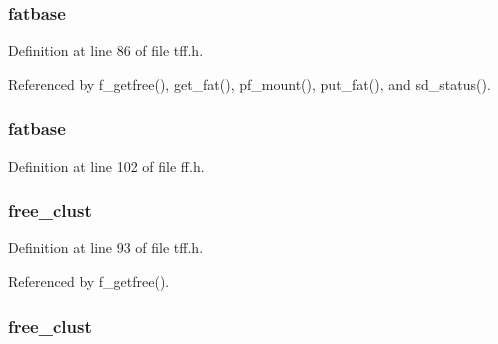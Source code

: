 \hypertarget{struct_f_a_t_f_s_a4c158f002bd87f70c1595baef8888d96}{
\subsubsection[{fatbase}]{ fatbase}}\label{struct_f_a_t_f_s_a4c158f002bd87f70c1595baef8888d96}


Definition at line 86 of file tff.\-h.



Referenced by f\-\_\-getfree(), get\-\_\-fat(), pf\-\_\-mount(), put\-\_\-fat(), and sd\-\_\-status().

\hypertarget{struct_f_a_t_f_s_a74e60540a346de6eb9f0c13d6203efa1}{
\subsubsection[{fatbase}]{ fatbase}}\label{struct_f_a_t_f_s_a74e60540a346de6eb9f0c13d6203efa1}


Definition at line 102 of file ff.\-h.

\hypertarget{struct_f_a_t_f_s_a7976c77220d4840b68e2aef308c770e5}{
\subsubsection[{free\-\_\-clust}]{ free\-\_\-clust}}\label{struct_f_a_t_f_s_a7976c77220d4840b68e2aef308c770e5}


Definition at line 93 of file tff.\-h.



Referenced by f\-\_\-getfree().

\hypertarget{struct_f_a_t_f_s_a509defa217cfb2eb777ed3c74c4ef426}{
\subsubsection[{free\-\_\-clust}]{ free\-\_\-clust}}\label{struct_f_a_t_f_s_a509defa217cfb2eb777ed3c74c4ef426}


